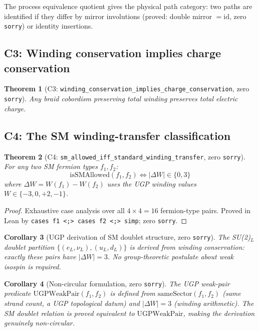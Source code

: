 \documentclass[12pt]{article}
\newtheorem{theorem}{Theorem}[section]
\newtheorem{corollary}[theorem]{Corollary}
\theoremstyle{remark}
\newcommand{\sorry}{\texttt{sorry}}
\newcommand{\lean}[1]{\texttt{#1}}
\begin{document}
The process equivalence quotient gives the physical path category: two paths
are identified if they differ by mirror involutions (proved: double mirror
$= \mathrm{id}$, zero \sorry) or identity insertions.

\subsection{C3: Winding conservation implies charge conservation}

\begin{theorem}[C3: \lean{winding\_conservation\_implies\_charge\_conservation},
zero \sorry]
Any braid cobordism preserving total winding preserves total electric charge.
\end{theorem}

\subsection{C4: The SM winding-transfer classification}
\label{subsec:c4}

\begin{theorem}[C4: \lean{sm\_allowed\_iff\_standard\_winding\_transfer},
zero \sorry]
\label{thm:c4}
For any two SM fermion types $f_1, f_2$:
\begin{equation}
  \text{isSMAllowed}(f_1, f_2) \iff |\Delta W| \in \{0, 3\}
\end{equation}
where $\Delta W = W(f_1) - W(f_2)$ uses the UGP winding values
$W \in \{-3, 0, +2, -1\}$.
\end{theorem}

\begin{proof}
Exhaustive case analysis over all $4 \times 4 = 16$ fermion-type pairs.
Proved in Lean by \lean{cases f1 <;> cases f2 <;> simp}; zero \sorry.
\end{proof}

\begin{corollary}[UGP derivation of SM doublet structure, zero \sorry]
The SU(2)$_L$ doublet partition $\{(e_L, \nu_L), (u_L, d_L)\}$ is \emph{derived}
from winding conservation: exactly these pairs have $|\Delta W| = 3$.  No
group-theoretic postulate about weak isospin is required.
\end{corollary}

\begin{corollary}[Non-circular formulation, zero \sorry]
The UGP weak-pair predicate $\mathrm{UGPWeakPair}(f_1, f_2)$ is defined from
$\mathrm{sameSector}(f_1, f_2)$ (same strand count, a UGP topological datum)
and $|\Delta W| = 3$ (winding arithmetic).  The SM doublet relation is proved
\emph{equivalent} to $\mathrm{UGPWeakPair}$, making the derivation genuinely
non-circular.
\end{corollary}
\end{document}
